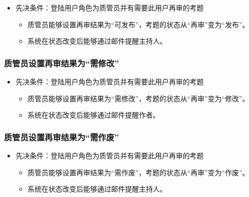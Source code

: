 \documentclass[hyperref, a4paper]{ctexart}
\providecommand{\tightlist}{%
  \setlength{\itemsep}{0pt}\setlength{\parskip}{0pt}}
\begin{document}
\begin{itemize}
\tightlist
\item
  先决条件：登陆用户角色为质管员并有需要此用户再审的考题

  \begin{itemize}
  \tightlist
  \item
    质管员能够设置再审结果为``可发布''，考题的状态从``再审''变为``发布''。
  \item
    系统在状态改变后能够通过邮件提醒主持人。
  \end{itemize}
\end{itemize}

\hypertarget{ux8d28ux7ba1ux5458ux8bbeux7f6eux518dux5ba1ux7ed3ux679cux4e3aux9700ux4feeux6539}{%
\subsubsection{质管员设置再审结果为``需修改''}\label{ux8d28ux7ba1ux5458ux8bbeux7f6eux518dux5ba1ux7ed3ux679cux4e3aux9700ux4feeux6539}}

\begin{itemize}
\tightlist
\item
  先决条件：登陆用户角色为质管员并有需要此用户再审的考题

  \begin{itemize}
  \tightlist
  \item
    质管员能够设置再审结果为``需修改''，考题的状态从``再审''变为``修改''。
  \item
    系统在状态改变后能够通过邮件提醒作者。
  \end{itemize}
\end{itemize}

\hypertarget{ux8d28ux7ba1ux5458ux8bbeux7f6eux518dux5ba1ux7ed3ux679cux4e3aux9700ux4f5cux5e9f}{%
\subsubsection{质管员设置再审结果为``需作废''}\label{ux8d28ux7ba1ux5458ux8bbeux7f6eux518dux5ba1ux7ed3ux679cux4e3aux9700ux4f5cux5e9f}}

\begin{itemize}
\tightlist
\item
  先决条件：登陆用户角色为质管员并有需要此用户再审的考题

  \begin{itemize}
  \tightlist
  \item
    质管员能够设置再审结果为``需作废''，考题的状态从``再审''变为``作废''。
  \item
    系统在状态改变后能够通过邮件提醒主持人。
  \end{itemize}
\end{itemize}
\end{document}
